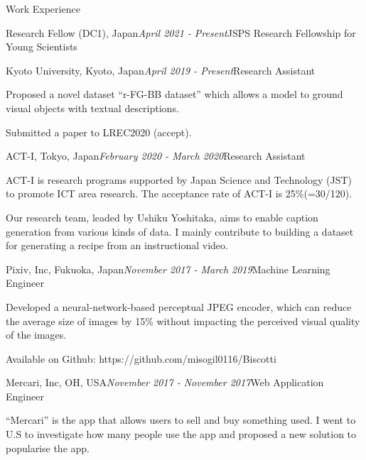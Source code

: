 \begin{rSection}{Work Experience}

\begin{rSubsection}{Research Fellow (DC1), Japan}{\em April 2021 - Present}{JSPS Research Fellowship for Young Scientists}{}
\end{rSubsection}

\begin{rSubsection}{Kyoto University, Kyoto, Japan}{\em April 2019 - Present}{Research Assistant}{}
\item Proposed a novel dataset ``r-FG-BB dataset'' which allows a model to ground visual objects with textual descriptions.
\item Submitted a paper to LREC2020 (accept).
\end{rSubsection}

\begin{rSubsection}{ACT-I, Tokyo, Japan}{\em February 2020 - March 2020}{Research Assistant}{}
\item ACT-I is research programs supported by Japan Science and Technology (JST) to promote ICT area research. The acceptance rate of ACT-I is 25\%(=30/120).
\item Our research team, leaded by Ushiku Yoshitaka, aims to enable caption generation from various kinds of data. I mainly contribute to building a dataset for generating a recipe from an instructional video.
\end{rSubsection}

\begin{rSubsection}{Pixiv, Inc, Fukuoka, Japan}{\em November 2017 - March 2019}{Machine Learning Engineer}{}
\item Developed a neural-network-based perceptual JPEG encoder, which can reduce the average size of images by 15\% without impacting the perceived visual quality of the images.
\item Available on Github: https://github.com/misogil0116/Biscotti
\end{rSubsection}

\begin{rSubsection}{Mercari, Inc, OH, USA}{\em November 2017 - November 2017}{Web Application Engineer}{}
\item ``Mercari'' is the app that allows users to sell and buy something used. I went to U.S to investigate how many people use the app and proposed a new solution to popularise the app.
\end{rSubsection}


\end{rSection}
